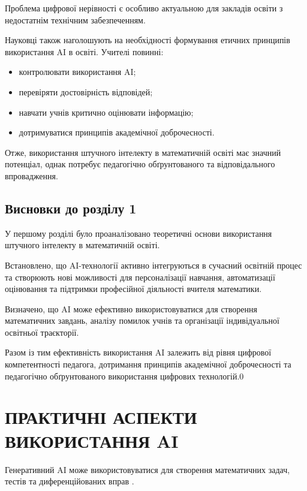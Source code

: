 Проблема цифрової нерівності є особливо актуальною для закладів освіти з недостатнім технічним забезпеченням.

Науковці також наголошують на необхідності формування етичних принципів використання AI в освіті. Учителі повинні:

\begin{itemize}
\item контролювати використання AI;
\item перевіряти достовірність відповідей;
\item навчати учнів критично оцінювати інформацію;
\item дотримуватися принципів академічної доброчесності.
\end{itemize}

Отже, використання штучного інтелекту в математичній освіті має значний потенціал, однак потребує педагогічно обґрунтованого та відповідального впровадження.

\subsection*{Висновки до розділу 1}

У першому розділі було проаналізовано теоретичні основи використання штучного інтелекту в математичній освіті.

Встановлено, що AI-технології активно інтегруються в сучасний освітній процес та створюють нові можливості для персоналізації навчання, автоматизації оцінювання та підтримки професійної діяльності вчителя математики.

Визначено, що AI може ефективно використовуватися для створення математичних завдань, аналізу помилок учнів та організації індивідуальної освітньої траєкторії.

Разом із тим ефективність використання AI залежить від рівня цифрової компетентності педагога, дотримання принципів академічної доброчесності та педагогічно обґрунтованого використання цифрових технологій.0



\section{ПРАКТИЧНІ АСПЕКТИ ВИКОРИСТАННЯ AI}

Генеративний AI може використовуватися для створення математичних задач, тестів та диференційованих вправ \parencite{Walkington2025}.

